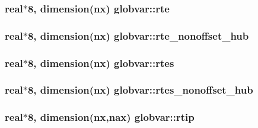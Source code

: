 \subsubsection[{rte}]{\setlength{\rightskip}{0pt plus 5cm}real$\ast$8, dimension({\bf nx}) globvar\+::rte}\label{namespaceglobvar_a25e9da91b03e68d6849d46ceaa05ffb3}
\hypertarget{namespaceglobvar_a43b488138b555f60d355edd22a416753}{}
\subsubsection[{rte\+\_\+nonoffset\+\_\+hub}]{\setlength{\rightskip}{0pt plus 5cm}real$\ast$8, dimension({\bf nx}) globvar\+::rte\+\_\+nonoffset\+\_\+hub}\label{namespaceglobvar_a43b488138b555f60d355edd22a416753}
\hypertarget{namespaceglobvar_ae7e75a0af87d0417e4bdfbb7b813ea99}{}
\subsubsection[{rtes}]{\setlength{\rightskip}{0pt plus 5cm}real$\ast$8, dimension({\bf nx}) globvar\+::rtes}\label{namespaceglobvar_ae7e75a0af87d0417e4bdfbb7b813ea99}
\hypertarget{namespaceglobvar_a4f08772533a642a2ae689a4e83b8e0e7}{}
\subsubsection[{rtes\+\_\+nonoffset\+\_\+hub}]{\setlength{\rightskip}{0pt plus 5cm}real$\ast$8, dimension({\bf nx}) globvar\+::rtes\+\_\+nonoffset\+\_\+hub}\label{namespaceglobvar_a4f08772533a642a2ae689a4e83b8e0e7}
\hypertarget{namespaceglobvar_a4e1a21e3c393a1e8a669dfc2ba04d5d7}{}
\subsubsection[{rtip}]{\setlength{\rightskip}{0pt plus 5cm}real$\ast$8, dimension({\bf nx},{\bf nax}) globvar\+::rtip}\label{namespaceglobvar_a4e1a21e3c393a1e8a669dfc2ba04d5d7}
\hypertarget{namespaceglobvar_a017229d1a37091ea8dac7e17f605f980}{}

